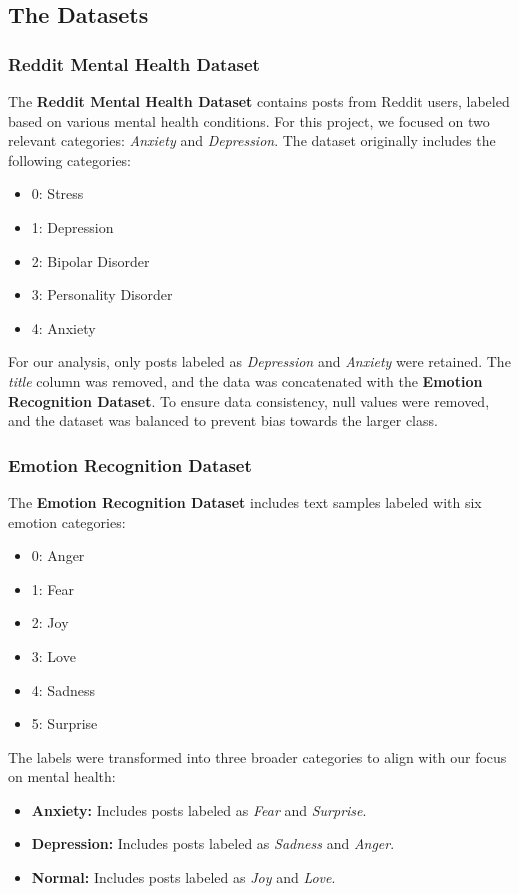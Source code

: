 \documentclass[runningheads,a4paper,11pt]{report}
\begin{document}
\subsection{The Datasets}
\label{section:datasets}

\subsubsection{Reddit Mental Health Dataset}
\label{section:reddit}
The \textbf{Reddit Mental Health Dataset} contains posts from Reddit users, labeled based on various mental health conditions. For this project, we focused on two relevant categories: \textit{Anxiety} and \textit{Depression}. The dataset originally includes the following categories:
\begin{itemize}
    \item 0: Stress
    \item 1: Depression
    \item 2: Bipolar Disorder
    \item 3: Personality Disorder
    \item 4: Anxiety
\end{itemize}
For our analysis, only posts labeled as \textit{Depression} and \textit{Anxiety} were retained. The \textit{title} column was removed, and the data was concatenated with the \textbf{Emotion Recognition Dataset}. To ensure data consistency, null values were removed, and the dataset was balanced to prevent bias towards the larger class.

\subsubsection{Emotion Recognition Dataset}
\label{section:emotion}
The \textbf{Emotion Recognition Dataset} includes text samples labeled with six emotion categories:
\begin{itemize}
    \item 0: Anger
    \item 1: Fear
    \item 2: Joy
    \item 3: Love
    \item 4: Sadness
    \item 5: Surprise
\end{itemize}
The labels were transformed into three broader categories to align with our focus on mental health:
\begin{itemize}
    \item \textbf{Anxiety:} Includes posts labeled as \textit{Fear} and \textit{Surprise}.
    \item \textbf{Depression:} Includes posts labeled as \textit{Sadness} and \textit{Anger}.
    \item \textbf{Normal:} Includes posts labeled as \textit{Joy} and \textit{Love}.
\end{itemize}
\end{document}
